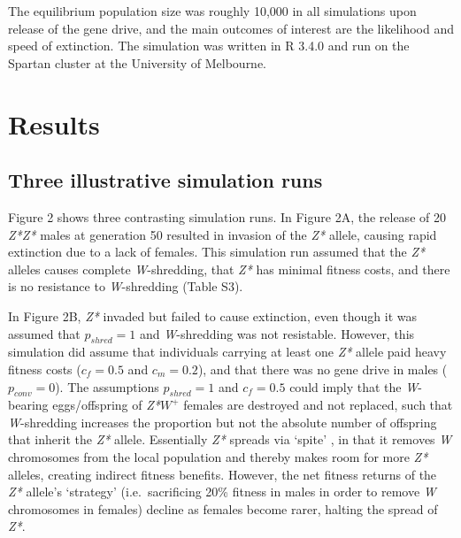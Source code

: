 \documentclass[]{rsos}%
\begin{document}
The equilibrium population size was roughly 10,000 in all simulations
upon release of the gene drive, and the main outcomes of interest are
the likelihood and speed of extinction. The simulation was written in R
3.4.0 and run on the Spartan cluster at the University of Melbourne.

\hypertarget{results}{%
\section{Results}\label{results}}

\hypertarget{three-illustrative-simulation-runs}{%
\subsection{Three illustrative simulation
runs}\label{three-illustrative-simulation-runs}}

Figure 2 shows three contrasting simulation runs. In Figure 2A, the
release of 20 \emph{Z*Z*} males at generation 50 resulted in invasion of
the \emph{Z*} allele, causing rapid extinction due to a lack of females.
This simulation run assumed that the \emph{Z*} alleles causes complete
\emph{W}-shredding, that \emph{Z*} has minimal fitness costs, and there
is no resistance to \emph{W}-shredding (Table S3).

In Figure 2B, \emph{Z*} invaded but failed to cause extinction, even
though it was assumed that \(p_{shred} = 1\) and \emph{W}-shredding was
not resistable. However, this simulation did assume that individuals
carrying at least one \emph{Z*} allele paid heavy fitness costs
(\(c_f = 0.5\) and \(c_m = 0.2\)), and that there was no gene drive in
males (\(p_{conv} = 0\)). The assumptions \(p_{shred} = 1\) and
\(c_f = 0.5\) could imply that the \emph{W}-bearing eggs/offspring of
\emph{Z*}\(W^+\) females are destroyed and not replaced, such that
\emph{W}-shredding increases the proportion but not the absolute number
of offspring that inherit the \emph{Z*} allele. Essentially \emph{Z*}
spreads via `spite' \citep{gardner2006sp}, in that it removes \emph{W}
chromosomes from the local population and thereby makes room for more
\emph{Z*} alleles, creating indirect fitness benefits. However, the net
fitness returns of the \emph{Z*} allele's `strategy' (i.e.~sacrificing
20\% fitness in males in order to remove \emph{W} chromosomes in
females) decline as females become rarer, halting the spread of
\emph{Z*}.
\end{document}
